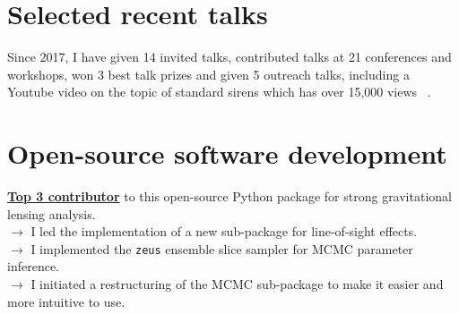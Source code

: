 \documentclass[11pt]{article}
\begin{document}
\section{Selected recent talks}
Since 2017, I have given 14 invited talks, contributed talks at 21 conferences and workshops, won 3 best talk prizes and given 5 outreach talks, including a Youtube video on the topic of standard sirens which has over 15,000 views ~\href{https://www.youtube.com/watch?v=DX2MiU2rX38}{\faYoutubePlay}.

\section{Open-source software development}

{
\href{https://github.com/lenstronomy/lenstronomy/graphs/contributors?from=2017-01-29&to=2024-01-12&type=a}{\textbf{Top 3 contributor}} to this open-source Python package for strong gravitational lensing analysis.\\
$\rightarrow$ I led the implementation of a new  sub-package for line-of-sight effects. \\
$\rightarrow$ I implemented the \texttt{zeus} ensemble slice sampler for MCMC parameter inference.\\
$\rightarrow$ I initiated a restructuring of the MCMC sub-package to make it easier and more intuitive to use.\\
}
\end{document}
